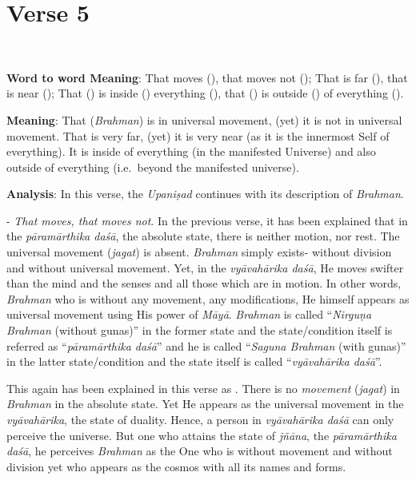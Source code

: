 \chapter{Verse 5}

\begin{moolashloka}
\\
\end{moolashloka}
\vskip -10pt

\textbf{Word to word Meaning}: That moves (), that moves not (); That is far (), that is near (); That () is inside () everything (), that () is outside () of everything ().

\textbf{Meaning}: That (\emph{Brahman}) is in universal movement, (yet) it is not in universal movement. That is very far, (yet) it is very near (as it is the innermost Self of everything). It is inside of everything (in the manifested Universe) and also outside of everything (i.e.\ beyond the manifested universe).

\textbf{Analysis}: In this verse, the \emph{Upaniṣad} continues with its description of \emph{Brahman}.

- \emph{That moves, that moves not}. In the previous verse, it has been explained that in the \emph{pāramārthika daśā}, the absolute state, there is neither motion, nor rest. The universal movement (\emph{jagat}) is absent. \emph{Brahman} simply exists- without division and without universal movement. Yet, in the \emph{vyāvahārika daśā}, He moves swifter than the mind and the senses and all those which are in motion. In other words, \emph{Brahman} who is without any movement, any modifications, He himself appears as universal movement using His power of \emph{Māyā}. \emph{Brahman} is called ``\emph{Nirguṇa Brahman} (without gunas)'' in the former state and the state/condition itself is referred as ``\emph{pāramārthika daśā}'' and he is called ``\emph{Saguna Brahman} (with gunas)'' in the latter state/condition and the state itself is called ``\emph{vyāvahārika daśā}''.

This again has been explained in this verse as . There is no \emph{movement} (\emph{jagat}) in \emph{Brahman} in the absolute state. Yet He appears as the universal movement in the \emph{vyāvahārika}, the state of duality. Hence, a person in \emph{vyāvahārika daśā} can only perceive the universe. But one who attains the state of \emph{jñāna}, the \emph{pāramārthika daśā}, he perceives \emph{Brahman} as the One who is without movement and without division yet who appears as the cosmos with all its names and forms.

